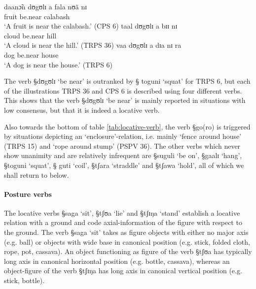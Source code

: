 \begin{exe}
\ex\label{ex:be-near}
 \begin{xlist}
  \ex\label{ex:}
\gll daanɔ̃n dʊgʊlɪ a fala nʊã nɪ\\
fruit be.near {\art} calabash {\reln}  {\postp}\\
\glt `A fruit is near the calabash.' (CPS 6)%
 \ex\label{ex:}
\gll taal dʊgʊlɪ a bɪɪ nɪ \\
 cloud be.near   {\art} hill  {\postp} \\
\glt `A cloud is near the hill.' (TRPS 36)%
 \ex\label{ex:}
\gll vaa  dʊgʊlɪ a dɪa nɪ ra   \\
dog be.near {\art} house {\postp} {\foc}\\
\glt `A dog is near the house.' (TRPS 6)%
 \end{xlist}
\end{exe}

The verb {\S dʊgʊlɪ}  `be near'  is  outranked by {\S
toguni}  `squat' for TRPS 6, but  each of the illustrations TRPS 36 and CPS 6
is  described using four different verbs. This shows that the verb {\S dʊgʊlɪ} 
`be near' is mainly reported in situations with low consensus, but  that it is
indeed
a locative verb.



Also towards the bottom of   table
 \ref{tab:locative-verb},  the verb   {\S go(ro)} is triggered by 
situations depicting an  `enclosure'-relation,
i.e. mainly `fence around house' (TRPS
15) and `rope around stump' (PSPV 36). The other verbs which never show 
unanimity and are relatively
infrequent are {\S suguli} `be on', {\S gaalɪ} `hang', {\S toguni} `squat',  {\S
guti} `coil', 
{\S  tʃara} `straddle' and  {\S tʃawa} `hold', all of  which we shall return to
below.  



\paragraph{Posture verbs}
\label{sec:SPA-post-v}


The locative verbs {\S saga} `sit',  {\S tʃʊa} `lie' and {\S tʃɪŋa} `stand'
establish a locative relation with a ground and  code  axial-information of the
figure with respect to the ground. The  verb {\S saga} `sit' takes as figure
objects with either no major axis (e.g. ball) or objects with wide base in
canonical position (e.g.  stick, folded cloth, rope, pot, cassava).  An object
functioning as figure of the verb {\S tʃʊa}  has typically long axis in
canonical horizontal position (e.g. bottle, cassava), whereas an object-figure
of the verb {\S tʃɪŋa} has long axis in canonical vertical position (e.g. 
stick,  bottle). 


